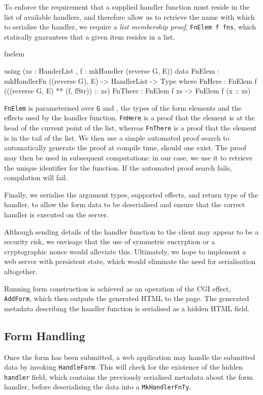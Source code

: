 To enforce the requirement that a supplied handler function must reside in the
list of available handlers, and therefore allow us to retrieve the name with
which to serialise the handler, we require a \textit{list membership proof},
\texttt{FnElem f fns}, which statically guarantees that a given item resides in
a list.

\begin{SaveVerbatim}{fnelem}

using (xs : HanderList , f : mkHandler (reverse G, E))
  data FnElem : mkHandlerFn ((reverse G), E) -> 
                HandlerList -> Type where
       FnHere  : FnElem f (((reverse G, E) ** 
                                  (f, fStr)) :: xs)
       FnThere : FnElem f xs -> FnElem f (x :: xs)

\end{SaveVerbatim}

\noindent
\texttt{FnElem} is parameterised over \texttt{G} and , the types of the
form elements and the effects used by the handler function. \texttt{FnHere}
is a proof that the element is at the head of the current point of the list,
whereas \texttt{FnThere} is a proof that the element is in the tail of 
the list. 
We then use a simple automated proof search to
automatically generate the proof at compile time, should one exist. The proof
may then be used in subsequent computations: in our case, we use it to retrieve
the unique identifier for the function. If the automated proof search fails,
compilation will fail.

Finally, we serialise the argument types, supported effects, and return
type of the handler, to allow the form data to be 
deserialised and ensure that the correct handler is executed on the
server. 

Although sending details of the handler function to the client may appear to be
a security risk, we envisage that the use of symmetric encryption or a
cryptographic nonce would alleviate this. Ultimately, we hope to implement a
web server with persistent state, which would eliminate the need for
serialisation altogether.

Running form construction is achieved as an operation of the CGI
effect, \texttt{AddForm}, which then outputs the generated HTML to the page.
The generated metadata describing the handler function is serialised as a
hidden HTML field.

\subsection{Form Handling}
\label{formhandling}
Once the form has been submitted, a web application may handle the submitted
data by invoking \texttt{HandleForm}. This will check for the
existence of the hidden \texttt{handler} field, which contains the previously
serialised metadata about the form handler, before deserialising the
data into a \texttt{MkHandlerFnTy}. 

